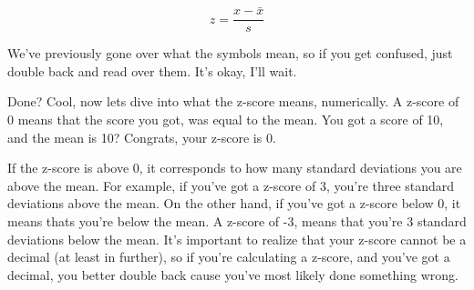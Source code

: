 \documentclass[11pt]{article}
\begin{document}
\begin{displaymath}
z = \frac{x - \bar{x}}{s}
\end{displaymath}

We've previously gone over what the symbols mean, so if you get confused, just double back and read over them. It's okay, I'll wait.

Done? Cool, now lets dive into what the z-score means, numerically. A z-score of 0 means that the score you got, was equal to the mean. You got a score of 10, and the mean is 10? Congrats, your z-score is 0.

If the z-score is above 0, it corresponds to how many standard deviations you are above the mean. For example, if you've got a z-score of 3, you're three standard deviations above the mean. On the other hand, if you've got a z-score below 0, it means thats you're below the mean. A z-score of -3, means that you're 3 standard deviations below the mean. It's important to realize that your z-score cannot be a decimal (at least in further), so if you're calculating a z-score, and you've got a decimal, you better double back cause you've most likely done something wrong.
\end{document}
